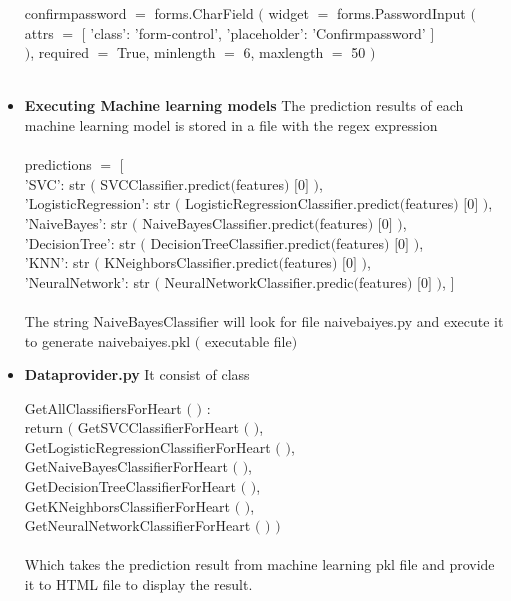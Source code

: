 \documentclass[oneside,12pt]{Classes/VTU}
\begin{document}
\begin{itemize}
		confirmpassword $=$ forms.CharField $($ widget $=$ forms.PasswordInput $($  \\
		attrs $=$ $[$ 'class': 'form-control', 'placeholder': 'Confirmpassword' $]$  \\
		$)$, required $=$ True, minlength $=$ 6, maxlength $=$ 50 $)$  \\
		\\
		\item \textbf{Executing Machine learning models} The prediction results of each machine learning model is stored in a file with the regex expression\\
		\\
		predictions $=$ $[$ \\
		'SVC': str $($ SVCClassifier.predict$($features$)$ $[$0$]$ $)$, \\
		'LogisticRegression': str $($ LogisticRegressionClassifier.predict$($features$)$ $[$0$]$ $)$, \\
		'NaiveBayes': str $($ NaiveBayesClassifier.predict$($features$)$ $[$0$]$ $)$, \\
		'DecisionTree': str $($ DecisionTreeClassifier.predict$($features$)$ $[$0$]$ $)$, \\
		'KNN': str $($ KNeighborsClassifier.predict$($features$)$ $[$0$]$ $)$, \\
		'NeuralNetwork': str $($ NeuralNetworkClassifier.predic$($features$)$ $[$0$]$ $)$, $]$ \\
		\\
		The string NaiveBayesClassifier will look for file naivebaiyes.py and execute it to generate naivebaiyes.pkl $($ executable file$)$
		
		\item \textbf{Dataprovider.py} It consist of class 
		
		GetAllClassifiersForHeart $($ $)$ : \\
		return $($ GetSVCClassifierForHeart $($ $)$, \\
		GetLogisticRegressionClassifierForHeart $($ $)$, \\
		GetNaiveBayesClassifierForHeart $($ $)$, \\
		GetDecisionTreeClassifierForHeart $($ $)$, \\
		GetKNeighborsClassifierForHeart $($ $)$, \\
		GetNeuralNetworkClassifierForHeart $($ $)$ $)$ \\
		\\
		Which takes the prediction result from machine learning pkl file and provide it to HTML file to display the result.
	\end{itemize}
	
\end{document}
